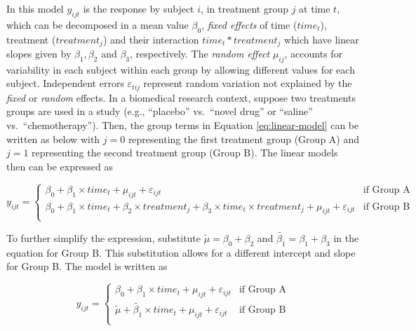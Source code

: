 \documentclass[
]{article}
\begin{document}
In this model \(y_{ijt}\) is the response by subject \(i\), in treatment group \(j\) at time \(t\), which can be decomposed in a mean value \(\beta_0\), \emph{fixed effects} of time (\(time_t\)), treatment (\(treatment_j\)) and their interaction \(time_t*treatment_j\) which have linear slopes given by \(\beta_1, \beta_2\) and \(\beta_3\), respectively. The \emph{random effect} \(\mu_{ij}\), accounts for variability in each subject within each group by allowing different values for each subject. Independent errors \(\varepsilon_{tij}\) represent random variation not explained by the \emph{fixed} or \emph{random} effects.
In a biomedical research context, suppose two treatments groups are used in a study (e.g., ``placebo'' vs.~``novel drug'' or ``saline'' vs.~``chemotherapy''). Then, the group terms in Equation \eqref{eq:linear-model} can be written as below with \(j=0\) representing the first treatment group (Group A) and \(j=1\) representing the second treatment group (Group B). The linear models then can be expressed as

\begin{equation}
y_{ijt} = \begin{cases}
\beta_0 + \beta_1\times time_{t}+\mu_{ijt}+\varepsilon_{ijt}   & \mbox{if Group A}\\
\beta_0 + \beta_1 \times time_{t} + \beta_2 \times treatment_{j} +\beta_3 \times time_{t} \times treatment_{j}+\mu_{ijt}+\varepsilon_{ijt}  & \mbox{if Group B}\\
\end{cases}
\label{eq:ANOVA-by-group}
\end{equation}

To further simplify the expression, substitute \(\widetilde{\mu}=\beta_0+\beta_{2}\) and \(\widetilde{\beta_{1}}=\beta_{1}+\beta_{3}\) in the equation for Group B. This substitution allows for a different intercept and slope for Group B. The model is written as

\begin{equation}
y_{ijt} = \begin{cases}
\beta_0 + \beta_1\times time_{t}+\mu_{ijt}+\varepsilon_{ijt}   & \mbox{if Group A}\\
\widetilde{\mu} + \widetilde{\beta_1} \times time_{t} +\mu_{ijt}+\varepsilon_{ijt}  & \mbox{if Group B}\\
\end{cases}
\label{eq:ANOVA-lines}
\end{equation}
\end{document}
